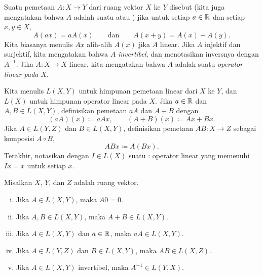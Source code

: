 \begin{defn}
Suatu pemetaan $A \colon X \to Y$ dari ruang vektor $X$ ke $Y$
disebut \emph{} (kita juga mengatakan bahwa $A$ adalah suatu
\emph{}
atau \emph{})
jika untuk setiap $a \in {\mathbb{R}}$ dan setiap $x,y \in X$,
\begin{equation*}
A(a x) = a A(x) \qquad \text{dan} \qquad A(x+y) = A(x)+A(y) .
\end{equation*}
Kita biasanya menulis $Ax$ alih-alih $A(x)$ jika $A$ linear.
Jika $A$ injektif dan surjektif, kita mengatakan bahwa $A$
\emph{invertibel},
dan menotasikan inversnya dengan $A^{-1}$.
Jika $A \colon X \to X$ linear, kita mengatakan bahwa $A$ adalah suatu
\emph{operator linear pada $X$}.

Kita menulis $L(X,Y)$ untuk himpunan pemetaan linear dari $X$ ke
$Y$, dan $L(X)$ untuk himpunan operator linear pada $X$.
Jika $a \in {\mathbb{R}}$ dan $A,B \in L(X,Y)$, definisikan
pemetaan $aA$ dan $A+B$ dengan
\begin{equation*}
(aA)(x) \coloneqq aAx ,
\qquad
(A+B)(x) \coloneqq Ax + Bx .
\end{equation*}
Jika $A \in L(Y,Z)$ dan $B \in L(X,Y)$, definisikan
pemetaan $AB \colon X \to Z$ sebagai komposisi $A \circ B$,
\begin{equation*}
ABx \coloneqq A(Bx) .
\end{equation*}
Terakhir, notasikan dengan $I \in L(X)$ suatu \emph{}: 
operator linear yang memenuhi $Ix = x$ untuk setiap $x$.
\end{defn}

\begin{prop} \label{prop:LXYvs}
Misalkan $X$, $Y$, dan $Z$ adalah ruang vektor.
\begin{enumerate}[(i)]
\item Jika $A \in L(X,Y)$, maka $A0 = 0$.
\item Jika $A,B \in L(X,Y)$, maka $A+B \in L(X,Y)$.
\item Jika $A \in L(X,Y)$ dan $a \in {\mathbb{R}}$, maka $aA \in L(X,Y)$.
\item Jika $A \in L(Y,Z)$ dan $B \in L(X,Y)$, maka $AB \in L(X,Z)$. 
\item Jika $A \in L(X,Y)$ invertibel, maka $A^{-1} \in L(Y,X)$.
\end{enumerate}
\end{prop}

